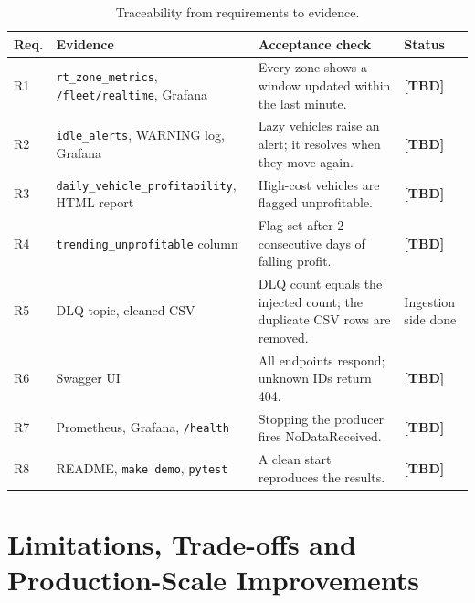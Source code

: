 \documentclass[11pt,a4paper]{article}
\newcommand{\code}[1]{\texttt{\small #1}}
\newcommand{\tbd}{\textcolor{orange!80!black}{\textbf{[TBD]}}}
\begin{document}
\begin{table}[H]
\centering\small
\begin{tabularx}{\linewidth}{l Y Y l}
\toprule
\textbf{Req.} & \textbf{Evidence} & \textbf{Acceptance check} & \textbf{Status} \\
\midrule
R1 & \code{rt\_zone\_metrics}, \code{/fleet/realtime}, Grafana & Every zone shows a window updated
within the last minute. & \tbd \\
R2 & \code{idle\_alerts}, WARNING log, Grafana & Lazy vehicles raise an alert; it resolves when they
move again. & \tbd \\
R3 & \code{daily\_vehicle\_profitability}, HTML report & High-cost vehicles are flagged
unprofitable. & \tbd \\
R4 & \code{trending\_unprofitable} column & Flag set after 2 consecutive days of falling
profit. & \tbd \\
R5 & DLQ topic, cleaned CSV & DLQ count equals the injected count; the duplicate CSV rows are
removed. & Ingestion side done \\
R6 & Swagger UI & All endpoints respond; unknown IDs return 404. & \tbd \\
R7 & Prometheus, Grafana, \code{/health} & Stopping the producer fires NoDataReceived. & \tbd \\
R8 & README, \code{make demo}, \code{pytest} & A clean start reproduces the results. & \tbd \\
\bottomrule
\end{tabularx}
\caption{Traceability from requirements to evidence.}
\label{tab:coverage}
\end{table}

\section{Limitations, Trade-offs and Production-Scale Improvements}
\end{document}
